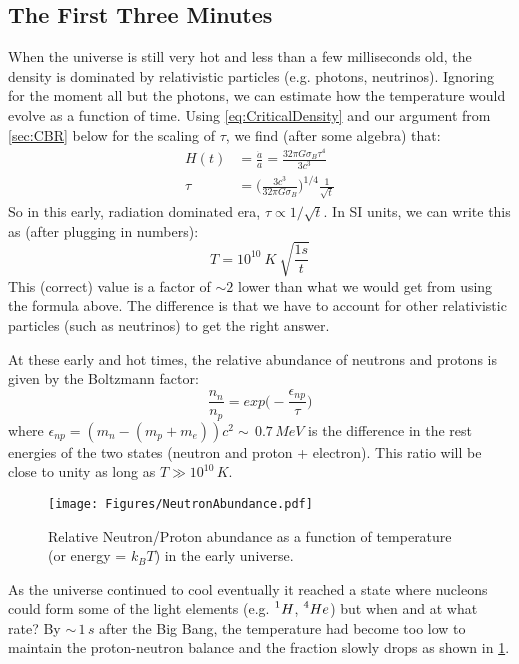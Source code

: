 \subsection{The First Three Minutes}
When the universe is still very hot and less than a few milliseconds old,
the density is dominated by relativistic particles (e.g. photons, neutrinos).
Ignoring for the moment all but the photons, we can estimate how the temperature would evolve as a function of time.
Using \cref{eq:CriticalDensity} and our argument from \cref{sec:CBR} below for the scaling of $\tau$, we find (after some algebra) that:
\begin{align}
H(t) &= \frac{\dot{a}}{a} = \frac{32 \pi G \sigma_B \tau^4}{3 c^3} \\
\tau &= \bigg(\frac{3 c^3}{32 \pi G \sigma_B}\bigg)^{1/4} \frac{1}{\sqrt{t}}
\end{align}
So in this early, radiation dominated era, $\tau \propto 1/\sqrt{t}$. In SI units, we can write this as (after plugging in numbers):
\begin{equation}
T = 10^{10}~K~\sqrt{\frac{1 s}{t}}
\end{equation}
This (correct) value is a factor of $\sim 2$ lower than what we would get from using the formula above. The difference is that we have to account for other relativistic particles (such as neutrinos) to get the right answer.

At these early and hot times, the relative abundance of neutrons and protons is given by the Boltzmann factor:
\begin{equation}
\frac{n_n}{n_p} = exp\bigg(-\frac{\epsilon_{np}}{\tau}\bigg)
\end{equation}
where $\epsilon_{np} = (m_n - (m_p + m_e))c^2 \sim\,0.7\,MeV$ is the 
difference in the rest energies of the two states (neutron and proton + 
electron). This ratio will be close to unity as long as $T \gg 10^{10}\,K$.
\begin{figure}[h]
\centering
\texttt{[image: Figures/NeutronAbundance.pdf]}
\caption{Relative Neutron/Proton abundance as a function of temperature 
(or energy = $k_B T$) in the early universe.}
\label{fig:Neutrons}
\end{figure}

As the universe continued to cool eventually it reached a state where nucleons could form some of the light elements (e.g. $\prescript{1}{}H$, 
$\prescript{4}{}He$) but when and at what rate? By $\sim\,1\,s$ after the Big Bang, the temperature had become too low to maintain the proton-neutron balance and the fraction slowly drops as shown in \cref{fig:Neutrons}.

